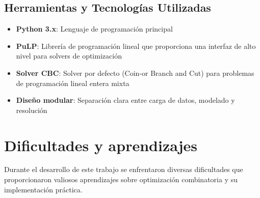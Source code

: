 \documentclass[a4paper,12pt]{article}
\begin{document}
\subsection{Herramientas y Tecnologías Utilizadas}

\begin{itemize}
    \item \textbf{Python 3.x}: Lenguaje de programación principal
    \item \textbf{PuLP}: Librería de programación lineal que proporciona una interfaz de alto nivel para solvers de optimización
    \item \textbf{Solver CBC}: Solver por defecto (Coin-or Branch and Cut) para problemas de programación lineal entera mixta
    \item \textbf{Diseño modular}: Separación clara entre carga de datos, modelado y resolución
\end{itemize}

\section{Dificultades y aprendizajes}

Durante el desarrollo de este trabajo se enfrentaron diversas dificultades que proporcionaron valiosos aprendizajes sobre optimización combinatoria y su implementación práctica.
\end{document}
